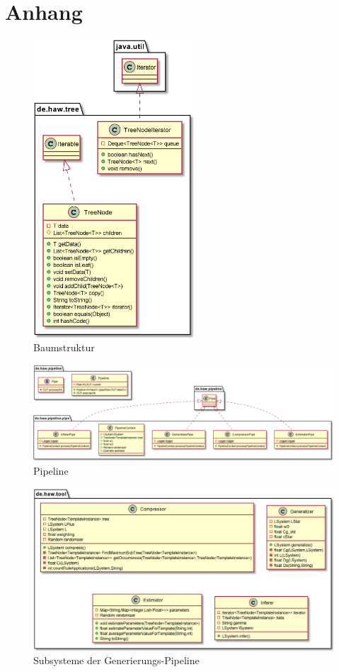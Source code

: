 
\chapter{Anhang}
\label{anhang}

\begin{figure}[H]
    \centering
    \includegraphics[width=6cm]{../images/tree.png}
    \caption{Baumstruktur}
    \label{tree}
\end{figure}

\begin{figure}[H]
    \centering
    \includegraphics[width=22cm,angle=90]{../images/pipeline.png}
    \caption{Pipeline}
    \label{pipeline}
\end{figure}

\begin{figure}[H]
    \centering
    \includegraphics[width=14.8cm]{../images/tool.png}
    \caption{Subsysteme der Generierungs-Pipeline}
    \label{tool}
\end{figure}

